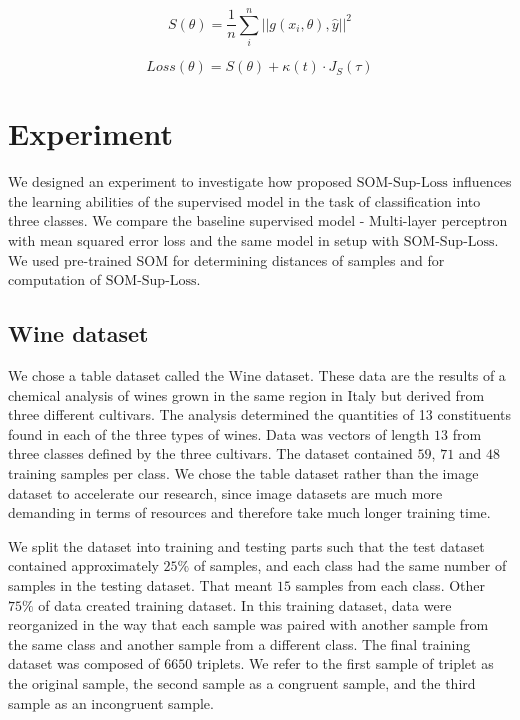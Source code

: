 \begin{equation}
	S(\theta) = \frac{1}{n} \sum_i^n  ||g(x_i, \theta), \hat{y}||^2
	\label{eq:mt-som-sup}
\end{equation} 

\begin{equation}
    Loss(\theta) = S(\theta) + \kappa(t) \cdot J_S(\tau)
    \label{comb-loss}
\end{equation}

\section{Experiment}
We designed an experiment to investigate how proposed $\text{SOM-Sup-Loss}$ influences the learning abilities of the supervised model in the task of classification into three classes. We compare the baseline supervised model - Multi-layer perceptron with mean squared error loss and the same model in setup with $\text{SOM-Sup-Loss}$. We used pre-trained SOM for determining distances of samples and for computation of $\text{SOM-Sup-Loss}$.

\subsection{Wine dataset}
We chose a table dataset called the Wine dataset. These data are the results of a chemical analysis of wines grown in the same region in Italy but derived from three different cultivars. The analysis determined the quantities of 13 constituents found in each of the three types of wines. Data was vectors of length $13$ from three classes defined by the three cultivars. The dataset contained $59$, $71$ and $48$ training samples per class. \cite{misc_wine_109} 
We chose the table dataset rather than the image dataset to accelerate our research, since image datasets are much more demanding in terms of resources and therefore take much longer training time.

We split the dataset into training and testing parts such that the test dataset contained approximately $25\%$ of samples, and each class had the same number of samples in the testing dataset. That meant $15$ samples from each class. Other $75\%$ of data created training dataset. In this training dataset, data were reorganized in the way that each sample was paired with another sample from the same class and another sample from a different class. The final training dataset was composed of $6650$ triplets. We refer to the first sample of triplet as the original sample, the second sample as a congruent sample, and the third sample as an incongruent sample.

